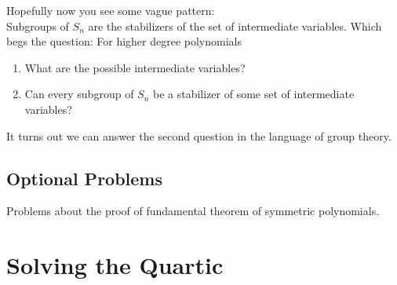 \documentclass[reqno, 12pt, letter]{article}
\theoremstyle{plain}
\theoremstyle{definition}
\theoremstyle{remark}
\numberwithin{equation}{section}
\begin{document}
		Hopefully now you see some vague pattern:\\
		Subgroups of $ S_n$ are the stabilizers of the set of intermediate variables. Which begs the question: For higher degree polynomials 
		\begin{enumerate}
			\item 
		What are the possible intermediate variables? 
	\item Can every subgroup of $ S_n$ be a stabilizer of some set of intermediate variables?
		\end{enumerate}
		
		It turns out we can answer the second question in the language of group theory.
		
		\subsection{Optional Problems}
		Problems about the proof of fundamental theorem of symmetric polynomials.



\newpage
\section{Solving the Quartic}



\newpage
\theendnotes
\end{document}
